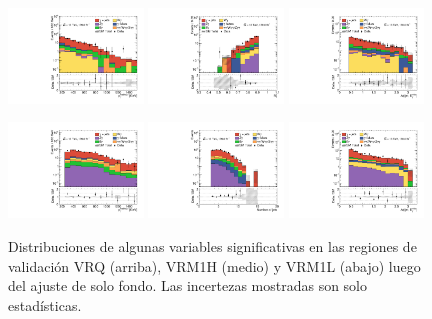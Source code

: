 \begin{figure}[!ht]
    \includegraphics[width=0.32\textwidth]{images/results/fr2_unblind/can_VRM1L_ph_pt0_afterFit.pdf}
    \includegraphics[width=0.32\textwidth]{images/results/fr2_unblind/can_VRM1L_rt4_afterFit.pdf}
    \includegraphics[width=0.32\textwidth]{images/results/fr2_unblind/can_VRM1L_dphi_jetmet_afterFit.pdf}

    \includegraphics[width=0.32\textwidth]{images/results/fr2_unblind/can_VRM1H_ph_pt0_afterFit.pdf}
    \includegraphics[width=0.32\textwidth]{images/results/fr2_unblind/can_VRM1H_jet_n_afterFit.pdf}
    \includegraphics[width=0.32\textwidth]{images/results/fr2_unblind/can_VRM1H_dphi_jetmet_afterFit.pdf}

    
    \caption{Distribuciones de algunas variables significativas en las regiones de validación VRQ (arriba), VRM1H (medio) y VRM1L (abajo) luego del ajuste de solo fondo. Las incertezas mostradas son solo estadísticas.}
    \label{fig:dist_vrqm_bkgonly}
\end{figure}

